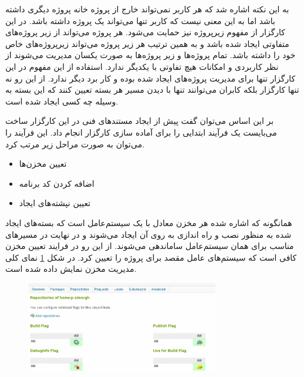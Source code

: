 به این نکته اشاره شد که هر کاربر نمی‌تواند خارج از پروژه خانه پروژه دیگری داشته
باشد اما به این معنی نیست که کاربر تنها می‌تواند یک پروژه داشته باشد. در این
کارگزار از مفهوم زیرپروژه نیز حمایت می‌شود. هر پروژه می‌تواند از زیر پروژه‌های
متفاوتی ایجاد شده باشد و به همین ترتیب هر زیر پروژه می‌تواند زیرپروژه‌های خاص
خود را داشته باشد. تمام پروژه‌ها و زیر پروژه‌ها به صورت یکسان مدیریت می‌شوند از
نظر کاربردی و امکانات هیچ تفاوتی با یکدیگر ندارد. استفاده از این مفهوم در این
کارگزار تنها برای مدیریت پروژه‌های ایجاد شده بوده و کار برد دیگر ندارد. از این
رو نه تنها کارگزار بلکه کابران می‌توانند تنها با دیدن مسیر هر بسته تعیین کنند که
این بسته به وسیله چه کسی ایجاد شده است.

بر این اساس می‌توان گفت پیش از ایجاد مستند‌های فنی در این کارگزار ساخت می‌بایست
یک فرآیند ابتدایی را برای آماده سازی کارگزار انجام داد. این فرآیند را می‌توان به
صورت مراحل زیر مرتب کرد.

\begin{itemize}
  \item تعیین مخزن‌ها
  \item اضافه کردن کد برنامه
  \item تعیین نپشته‌های ایجاد
\end{itemize}

همانگونه که اشاره شده هر مخزن معادل با یک سیستم‌عامل است که بسته‌های ایجاد شده
به منظور نصب و راه اندازی به روی آن ایجاد می‌شوند و در نهایت در مسیرهای مناسب
برای همان سیستم‌عامل ساماندهی می‌شوند. از این رو در فرایند تعیین مخزن کافی است
که سیستم‌های عامل مقصد برای پروژه را تعیین کرد. در شکل 
\ref{image/standard/build/opensuse-project-repository}
نمای کلی مدیریت مخزن نمایش داده شده است.

\begin{figure}
\centering
\includegraphics[width=0.75\textwidth]{image/standard/build/opensuse-project-repository.png}
\caption[]{}
\label{image/standard/build/opensuse-project-repository}
\end{figure}


